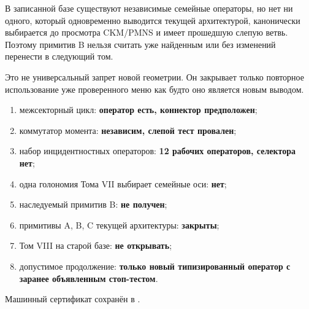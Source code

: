 \begin{theorem}
В записанной базе существуют независимые семейные операторы, но нет ни
одного, который одновременно выводится текущей архитектурой, канонически
выбирается до просмотра CKM/PMNS и имеет прошедшую слепую ветвь. Поэтому
примитив B нельзя считать уже найденным или без изменений перенести в
следующий том.
\end{theorem}

\begin{remark}
Это не универсальный запрет новой геометрии. Он закрывает только повторное
использование уже проверенного меню как будто оно является новым выводом.
\end{remark}

\begin{protocol}
\begin{enumerate}
 \item межсекторный цикл: \textbf{оператор есть, коннектор предположен};
 \item коммутатор момента: \textbf{независим, слепой тест провален};
 \item набор инцидентностных операторов: \textbf{12 рабочих операторов, селектора нет};
 \item одна голономия Тома VII выбирает семейные оси: \textbf{нет};
 \item наследуемый примитив B: \textbf{не получен};
 \item примитивы A, B, C текущей архитектуры: \textbf{закрыты};
 \item Том VIII на старой базе: \textbf{не открывать};
 \item допустимое продолжение: \textbf{только новый типизированный оператор
 с заранее объявленным стоп-тестом}.
\end{enumerate}
\end{protocol}

Машинный сертификат сохранён в
.